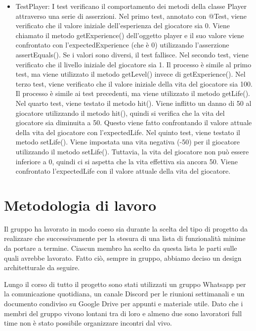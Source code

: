 \documentclass[a4paper,12pt]{report}
\begin{document}
\begin{itemize}
	\item TestPlayer: I test verificano il comportamento dei metodi della classe Player attraverso una serie di asserzioni.
	Nel primo test, annotato con @Test, viene verificato che il valore iniziale dell'esperienza del giocatore sia 0. Viene chiamato il metodo getExperience() dell'oggetto player e il suo valore viene confrontato con l'expectedExperience (che è 0) utilizzando l'asserzione assertEquals(). Se i valori sono diversi, il test fallisce.
    Nel secondo test, viene verificato che il livello iniziale del giocatore sia 1. Il processo è simile al primo test, ma viene utilizzato il metodo getLevel() invece di getExperience().
    Nel terzo test, viene verificato che il valore iniziale della vita del giocatore sia 100. Il processo è simile ai test precedenti, ma viene utilizzato il metodo getLife().
    Nel quarto test, viene testato il metodo hit(). Viene inflitto un danno di 50 al giocatore utilizzando il metodo hit(), quindi si verifica che la vita del giocatore sia diminuita a 50. Questo viene fatto confrontando il valore attuale della vita del giocatore con l'expectedLife.
    Nel quinto test, viene testato il metodo setLife(). Viene impostata una vita negativa (-50) per il giocatore utilizzando il metodo setLife(). Tuttavia, la vita del giocatore non può essere inferiore a 0, quindi ci si aspetta che la vita effettiva sia ancora 50. Viene confrontato l'expectedLife con il valore attuale della vita del giocatore.
\end{itemize}

\section{Metodologia di lavoro}
Il gruppo ha lavorato in modo coeso sia durante la scelta del tipo di progetto da realizzare che successivamente per la stesura di una lista di funzionalità minime da portare a termine. Ciascun membro ha scelto da questa lista le parti sulle quali avrebbe lavorato. Fatto ciò, sempre in gruppo, abbiamo deciso un design architetturale da seguire. 

Lungo il corso di tutto il progetto sono stati utilizzati un gruppo Whatsapp per la comunicazione quotidiana, un canale Discord per le riunioni settimanali e un documento condiviso su Google Drive per appunti e materiale utile. Dato che i membri del gruppo vivono lontani tra di loro e almeno due sono lavoratori full time non è stato possibile organizzare incontri dal vivo. 
\end{document}
